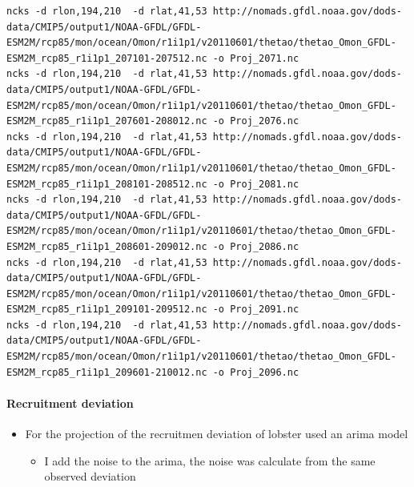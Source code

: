 \documentclass[11pt]{article}
\begin{document}
\begin{itemize}
\begin{itemize}
\begin{verbatim}
ncks -d rlon,194,210  -d rlat,41,53 http://nomads.gfdl.noaa.gov/dods-data/CMIP5/output1/NOAA-GFDL/GFDL-ESM2M/rcp85/mon/ocean/Omon/r1i1p1/v20110601/thetao/thetao_Omon_GFDL-ESM2M_rcp85_r1i1p1_207101-207512.nc -o Proj_2071.nc
ncks -d rlon,194,210  -d rlat,41,53 http://nomads.gfdl.noaa.gov/dods-data/CMIP5/output1/NOAA-GFDL/GFDL-ESM2M/rcp85/mon/ocean/Omon/r1i1p1/v20110601/thetao/thetao_Omon_GFDL-ESM2M_rcp85_r1i1p1_207601-208012.nc -o Proj_2076.nc
ncks -d rlon,194,210  -d rlat,41,53 http://nomads.gfdl.noaa.gov/dods-data/CMIP5/output1/NOAA-GFDL/GFDL-ESM2M/rcp85/mon/ocean/Omon/r1i1p1/v20110601/thetao/thetao_Omon_GFDL-ESM2M_rcp85_r1i1p1_208101-208512.nc -o Proj_2081.nc
ncks -d rlon,194,210  -d rlat,41,53 http://nomads.gfdl.noaa.gov/dods-data/CMIP5/output1/NOAA-GFDL/GFDL-ESM2M/rcp85/mon/ocean/Omon/r1i1p1/v20110601/thetao/thetao_Omon_GFDL-ESM2M_rcp85_r1i1p1_208601-209012.nc -o Proj_2086.nc
ncks -d rlon,194,210  -d rlat,41,53 http://nomads.gfdl.noaa.gov/dods-data/CMIP5/output1/NOAA-GFDL/GFDL-ESM2M/rcp85/mon/ocean/Omon/r1i1p1/v20110601/thetao/thetao_Omon_GFDL-ESM2M_rcp85_r1i1p1_209101-209512.nc -o Proj_2091.nc
ncks -d rlon,194,210  -d rlat,41,53 http://nomads.gfdl.noaa.gov/dods-data/CMIP5/output1/NOAA-GFDL/GFDL-ESM2M/rcp85/mon/ocean/Omon/r1i1p1/v20110601/thetao/thetao_Omon_GFDL-ESM2M_rcp85_r1i1p1_209601-210012.nc -o Proj_2096.nc
\end{verbatim}
\end{itemize}
\end{itemize}
\paragraph*{Recruitment deviation}
\label{sec-6-2-1}

\begin{itemize}
\item For the projection of the recruitmen deviation of lobster used an arima model
\begin{itemize}
\item I add the noise to the arima,  the noise was calculate from the same observed deviation
\end{itemize}
\end{itemize}
\end{document}
